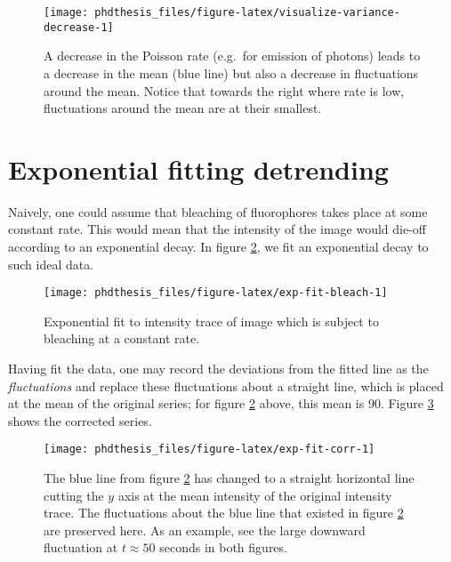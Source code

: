 \documentclass[12pt,]{book}
\theoremstyle{definition}
\theoremstyle{definition}
\theoremstyle{definition}
\theoremstyle{remark}
\begin{document}
\begin{figure}

\texttt{[image: phdthesis\_files/figure-latex/visualize-variance-decrease-1]} \hfill{}

\caption{A decrease in the Poisson rate
(e.g.~for emission of photons) leads to a decrease in the mean (blue
line) but also a decrease in fluctuations around the mean. Notice that
towards the right where rate is low, fluctuations around the mean are at
their smallest.}\label{fig:visualize-variance-decrease}
\end{figure}

\section{Exponential fitting
detrending}\label{exponential-fitting-detrending}

Naively, one could assume that bleaching of fluorophores takes place at
some constant rate. This would mean that the intensity of the image
would die-off according to an exponential decay. In figure
\ref{fig:exp-fit-bleach}, we fit an exponential decay to such ideal
data.




\begin{figure}

\texttt{[image: phdthesis\_files/figure-latex/exp-fit-bleach-1]} \hfill{}

\caption{Exponential fit to intensity trace of image
which is subject to bleaching at a constant rate.}\label{fig:exp-fit-bleach}
\end{figure}

Having fit the data, one may record the deviations from the fitted line
as the \emph{fluctuations} and replace these fluctuations about a
straight line, which is placed at the mean of the original series; for
figure \ref{fig:exp-fit-bleach} above, this mean is 90. Figure
\ref{fig:exp-fit-corr} shows the corrected series.








\begin{figure}

\texttt{[image: phdthesis\_files/figure-latex/exp-fit-corr-1]} \hfill{}

\caption{The blue line from figure
\ref{fig:exp-fit-bleach} has changed to a straight horizontal line
cutting the \(y\) axis at the mean intensity of the original intensity
trace. The fluctuations about the blue line that existed in figure
\ref{fig:exp-fit-bleach} are preserved here. As an example, see the
large downward fluctuation at \(t \approx 50\) seconds in both figures.}\label{fig:exp-fit-corr}
\end{figure}
\end{document}
